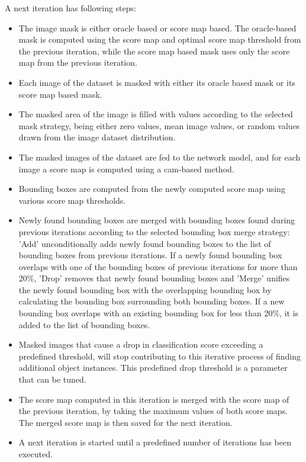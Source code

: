 A next iteration has following steps:
\begin{itemize}
    \item The image mask is either oracle based or score map based. The oracle-based mask is computed using the score map and optimal score map threshold from the previous iteration, while the score map based mask uses only the score map from the previous iteration.
    \item Each image of the dataset is masked with either its oracle based mask or its score map based mask.
    \item The masked area of the image is filled with values according to the selected mask strategy, being either zero values, mean image values, or random values drawn from the image dataset distribution.
    \item The masked images of the dataset are fed to the network model, and for each image a score map is computed using a \acrshort{cam}-based method.
    \item Bounding boxes are computed from the newly computed score map using various score map thresholds.
    \item Newly found bounding boxes are merged with bounding boxes found during previous iterations according to the selected bounding box merge strategy: 'Add' unconditionally adds newly found bounding boxes to the list of bounding boxes from previous iterations. If a newly found bounding box overlaps with one of the bounding boxes of previous iterations for more than 20\%, 'Drop' removes that newly found bounding boxes and 'Merge' unifies the newly found bounding box with the overlapping bounding box by calculating the bounding box surrounding both bounding boxes. If a new bounding box overlaps with an existing bounding box for less than 20\%, it is added to the list of bounding boxes.
    \item Masked images that cause a drop in classification score exceeding a predefined threshold, will stop contributing to this iterative process of finding additional object instances. This predefined drop threshold is a parameter that can be tuned.
    \item The score map computed in this iteration is merged with the score map of the previous iteration, by taking the maximum values of both score maps. The merged score map is then saved for the next iteration.
    \item A next iteration is started until a predefined number of iterations has been executed.
\end{itemize}

